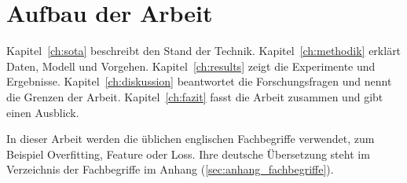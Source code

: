 \section{Aufbau der Arbeit}
\label{sec:aufbau}
Kapitel~\ref{ch:sota} beschreibt den Stand der Technik.
Kapitel~\ref{ch:methodik} erklärt Daten, Modell und Vorgehen.
Kapitel~\ref{ch:results} zeigt die Experimente und Ergebnisse.
Kapitel~\ref{ch:diskussion} beantwortet die Forschungsfragen und nennt die
Grenzen der Arbeit. Kapitel~\ref{ch:fazit} fasst die Arbeit zusammen und gibt
einen Ausblick.

In dieser Arbeit werden die üblichen englischen Fachbegriffe verwendet, zum
Beispiel Overfitting, Feature oder Loss. Ihre deutsche Übersetzung steht im
Verzeichnis der Fachbegriffe im Anhang (\cref{sec:anhang_fachbegriffe}).

